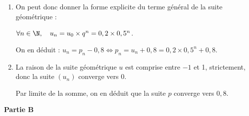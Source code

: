 \begin{enumerate}
\begin{enumerate}
La relation de récurrence de la suite $\left(u_n\right)$ est donc bien celle d'une suite géométrique, de raison $q = 0,5$. 

Le premier terme de la suite est $u_0 = p_0 - 0,8 = 1 - 0,8 = 0,2$.

		\item On peut donc donner la forme explicite du terme général de la suite géométrique :

$\forall n \in \N, \quad u_n = u_0 \times q^n = 0,2\times 0,5^n$.

On en déduit : $u_n = p_n - 0,8 \iff p_n = u_n + 0,8 = 0,2\times 0,5^n + 0,8$.

		\item La raison de la suite géométrique $u$ est comprise entre $- 1$ et 1, strictement, donc la suite $\left(u_n\right)$ converge vers 0.

Par limite de la somme, on en déduit que la suite $p$ converge vers $0,8$.
	\end{enumerate}
\end{enumerate}

\bigskip
\textbf{Partie B}
\medskip

